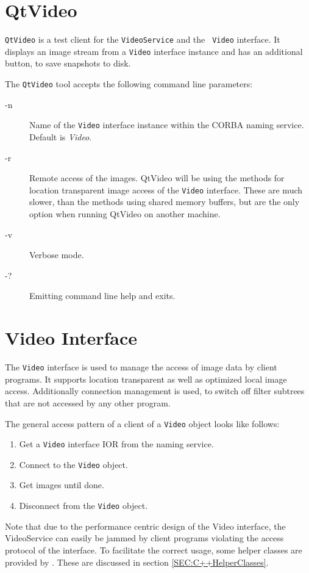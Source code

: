 \section{QtVideo}

{\tt QtVideo} is a test client for the {\tt VideoService} and the {\tt
  Video} interface. It displays an image stream from a {\tt Video}
interface instance and has an additional button, to save snapshots to
disk.

The {\tt QtVideo} tool accepts the following command line parameters:
\begin{description}
\item[-n] Name of the {\tt Video} interface instance within the CORBA
  naming service. Default is {\em Video}.
\item[-r] Remote access of the images. QtVideo will be using the
  methods for location transparent image access of the {\tt Video}
  interface. These are much slower, than the methods using shared
  memory buffers, but are the only option when running QtVideo on
  another machine.
\item[-v] Verbose mode.
\item[-?] Emitting command line help and exits.
\end{description}

\section{Video Interface}

The {\tt Video} interface is used to manage the access of image data
by client programs. It supports location transparent as well as
optimized local image access. Additionally connection management is
used, to switch off filter subtrees that are not accessed by any other
program.

The general access pattern of a client of a {\tt Video} object looks
like follows:
\begin{enumerate}
\item Get a {\tt Video} interface IOR from the naming service.
\item Connect to the {\tt Video} object.
\item Get images until done.
\item Disconnect from the {\tt Video} object.
\end{enumerate}

Note that due to the performance centric design of the Video
interface, the VideoService can easily be jammed by client programs
violating the access protocol of the interface. To facilitate the
correct usage, some helper classes are provided by \miro. These are
discussed in section \ref{SEC:C++HelperClasses}.

